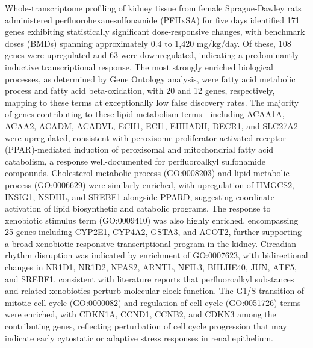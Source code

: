 Whole-transcriptome profiling of kidney tissue from female Sprague-Dawley rats administered perfluorohexanesulfonamide (PFHxSA) for five days identified 171 genes exhibiting statistically significant dose-responsive changes, with benchmark doses (BMDs) spanning approximately 0.4 to 1,420 mg/kg/day. Of these, 108 genes were upregulated and 63 were downregulated, indicating a predominantly inductive transcriptional response. The most strongly enriched biological processes, as determined by Gene Ontology analysis, were fatty acid metabolic process and fatty acid beta-oxidation, with 20 and 12 genes, respectively, mapping to these terms at exceptionally low false discovery rates. The majority of genes contributing to these lipid metabolism terms—including ACAA1A, ACAA2, ACADM, ACADVL, ECH1, ECI1, EHHADH, DECR1, and SLC27A2—were upregulated, consistent with peroxisome proliferator-activated receptor (PPAR)-mediated induction of peroxisomal and mitochondrial fatty acid catabolism, a response well-documented for perfluoroalkyl sulfonamide compounds. Cholesterol metabolic process (GO:0008203) and lipid metabolic process (GO:0006629) were similarly enriched, with upregulation of HMGCS2, INSIG1, NSDHL, and SREBF1 alongside PPARD, suggesting coordinate activation of lipid biosynthetic and catabolic programs. The response to xenobiotic stimulus term (GO:0009410) was also highly enriched, encompassing 25 genes including CYP2E1, CYP4A2, GSTA3, and ACOT2, further supporting a broad xenobiotic-responsive transcriptional program in the kidney. Circadian rhythm disruption was indicated by enrichment of GO:0007623, with bidirectional changes in NR1D1, NR1D2, NPAS2, ARNTL, NFIL3, BHLHE40, JUN, ATF5, and SREBF1, consistent with literature reports that perfluoroalkyl substances and related xenobiotics perturb molecular clock function. The G1/S transition of mitotic cell cycle (GO:0000082) and regulation of cell cycle (GO:0051726) terms were enriched, with CDKN1A, CCND1, CCNB2, and CDKN3 among the contributing genes, reflecting perturbation of cell cycle progression that may indicate early cytostatic or adaptive stress responses in renal epithelium.

